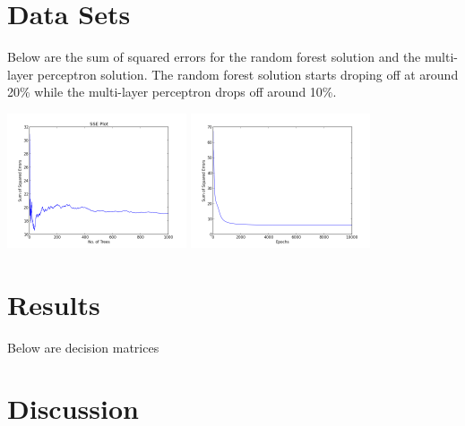 \documentclass{article}
\begin{document}
\section{Data Sets}



Below are the sum of squared errors for the random forest solution and the multi-layer perceptron
solution. The random forest solution starts droping off at around 20\% while the
multi-layer perceptron drops off around 10\%.


\includegraphics[width=200px]{dt_sse_training.png}
\includegraphics[width=200px]{mlp_sse_training.png}


\section{Results}


Below are decision matrices


\section{Discussion}
\end{document}
